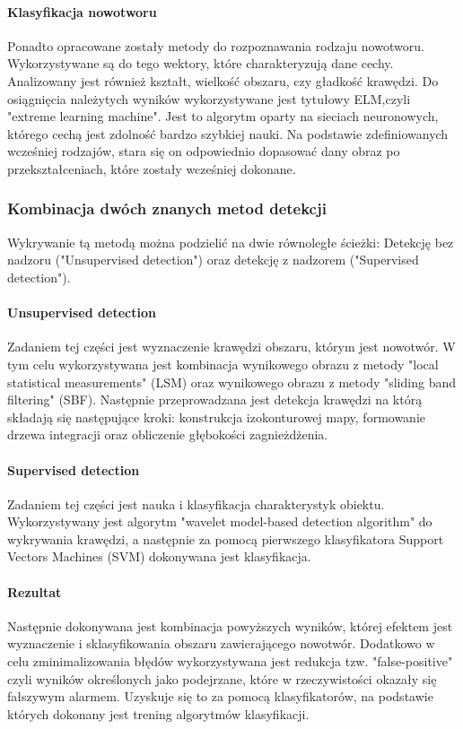 \documentclass[11pt,openany]{sprawozdanie-agh}
\begin{document}
\paragraph{Klasyfikacja nowotworu\\}
Ponadto opracowane zostały metody do rozpoznawania rodzaju nowotworu. Wykorzystywane są do tego wektory, które charakteryzują dane cechy. Analizowany jest również kształt, wielkość obszaru, czy gładkość krawędzi. Do osiągnięcia należytych wyników wykorzystywane jest tytułowy ELM,czyli "extreme learning machine". Jest to algorytm oparty na sieciach neuronowych, którego cechą jest zdolność bardzo szybkiej nauki. Na podstawie zdefiniowanych wcześniej rodzajów, stara się on odpowiednio dopasować dany obraz po przekształceniach, które zostały wcześniej dokonane.

\subsubsection{Kombinacja dwóch znanych metod detekcji}
Wykrywanie tą metodą można podzielić na dwie równoległe ścieżki: Detekcję bez nadzoru ("Unsupervised detection") oraz detekcję z nadzorem ("Supervised detection").

\paragraph{Unsupervised detection\\}
Zadaniem tej części jest wyznaczenie krawędzi obszaru, którym jest nowotwór. W tym celu wykorzystywana jest kombinacja wynikowego obrazu z metody "local statistical measurements" (LSM) oraz wynikowego obrazu z metody "sliding band filtering" (SBF). Następnie przeprowadzana jest detekcja krawędzi na którą składają się następujące kroki: konstrukcja izokonturowej mapy, formowanie drzewa integracji oraz obliczenie głębokości zagnieżdżenia. 

\paragraph{Supervised detection\\}
Zadaniem tej części jest nauka i klasyfikacja charakterystyk obiektu. Wykorzystywany jest algorytm "wavelet model-based detection algorithm" do wykrywania krawędzi, a następnie za pomocą pierwszego klasyfikatora Support Vectors Machines (SVM) dokonywana jest klasyfikacja.

\paragraph{Rezultat\\}
Następnie dokonywana jest kombinacja powyższych wyników, której efektem jest wyznaczenie i sklasyfikowania obszaru zawierającego nowotwór.
Dodatkowo w celu zminimalizowania błędów wykorzystywana jest redukcja tzw. "false-positive" czyli wyników określonych jako podejrzane, które w rzeczywistości okazały się fałszywym alarmem. Uzyskuje się to za pomocą klasyfikatorów, na podstawie których dokonany jest trening algorytmów klasyfikacji.
\end{document}
